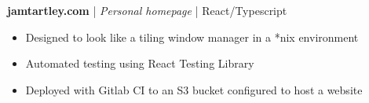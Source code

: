 \item \textbf{jamtartley.com} | \textit{Personal homepage} | {React/Typescript}
\begin{itemize}
    \item Designed to look like a tiling window manager in a *nix environment
    \item Automated testing using React Testing Library
    \item Deployed with Gitlab CI to an S3 bucket configured to host a website
\end{itemize}
